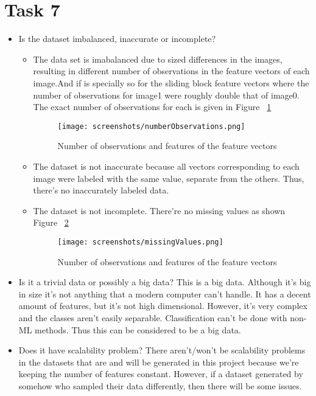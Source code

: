 \documentclass[sigconf]{acmart}
\begin{document}
\section{Task 7}
\begin{itemize}
    \item Is the dataset imbalanced, inaccurate or incomplete?
    \begin{itemize}
        \item The data set is imabalanced due to sized differences in the images, resulting in different number of observations in the feature vectors of each image.And if is specially so for the sliding block feature vectors where the number of observations for image1 were roughly double that of image0. The exact number of observations for each is given in Figure ~\ref{fig:observationsAndFeatures} 
            \begin{figure}[h]
            \centering
            \texttt{[image: screenshots/numberObservations.png]}
            \caption{Number of observations and features of the feature vectors}
            \label{fig:observationsAndFeatures}
            \end{figure}
        \item The dataset is not inaccurate because all vectors corresponding to each image were labeled with the same value, separate from the others. Thus, there's no inaccurately labeled data.
        \item The dataset is not incomplete. There're no missing values as shown Figure ~\ref{fig:missingValues}
            \begin{figure}[h]
            \centering
            \texttt{[image: screenshots/missingValues.png]}
            \caption{Number of observations and features of the feature vectors}
            \label{fig:missingValues}
            \end{figure}
    \end{itemize}
    \item Is it a trivial data or possibly a big data? 
        \indent This is a big data. Although it's big in size it's not anything that a modern computer can't handle. It has a decent amount of features, but it's not high dimensional. However, it's very complex and the classes aren't easily separable. Classification can't be done with non-ML methods. Thus this can be considered to be a big data. 
      \item Does it have scalability problem? There aren't/won't be scalability problems in the datasets that are and will be generated in this project because we're keeping the number of features constant. However, if a dataset generated by somehow who sampled their data differently, then there will be some issues.

\end{itemize}
\end{document}
